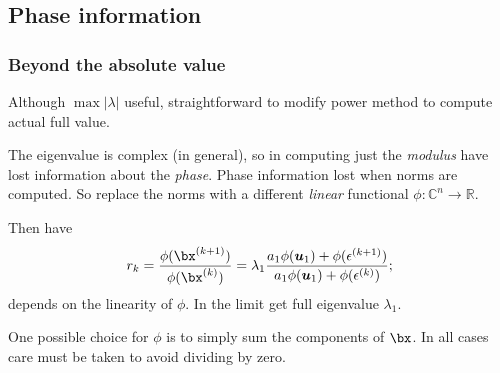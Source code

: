 \documentclass{beamer}
\newcommand{\bfm}[1]{{\boldsymbol{#1}}}
\begin{document}
\subsection{Phase information}


\begin{frame}
  \frametitle{Beyond the absolute value}

  Although $\max |\lambda|$ useful, straightforward to modify power
  method to compute actual full value. \pause

  \vspace{1ex}

  The eigenvalue is complex (in general), so in computing just the
  \emph{modulus} have lost information about the \emph{phase}.  Phase
  information lost when norms are computed. So replace the norms with
  a different \emph{linear} functional $\phi: {\mathbb C}^n
  \rightarrow {\mathbb R}$. \pause

  \vspace{1ex}

  Then have
  \begin{equation*}
    r_k = \frac{\phi(\bx^{(k+1)})}{\phi(\bx^{(k)})} = \lambda_1
    \frac{ a_1 \phi(\bfm{u}_1) + \phi(\epsilon^{(k+1)})}{ a_1 \phi( \bfm{u}_1) +
      \phi(\epsilon^{(k)})};
  \end{equation*}
  depends on the linearity of $\phi$. In the limit get full eigenvalue
  $\lambda_1$. \pause

  \vspace{1ex}

  One possible choice for $\phi$ is to simply sum the components of
  $\bx$. In all cases care must be taken to avoid dividing by zero.

\end{frame}
\end{document}

